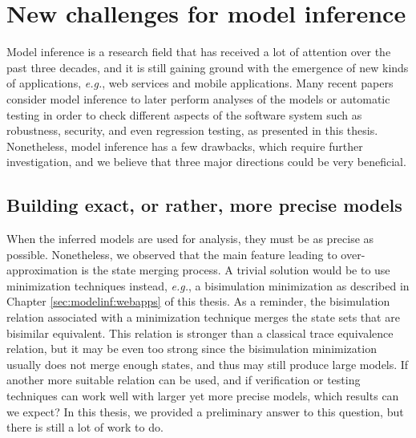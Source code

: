 \section{New challenges for model inference}
\label{sec:conclusion:modelinf}

Model inference is a research field that has received a lot of
attention over the past three decades, and it is still gaining
ground with the emergence of new kinds of applications, \emph{e.g.}, web
services and mobile applications. Many recent papers consider
model inference to later perform analyses of the models or
automatic testing in order to check different aspects of the
software system such as robustness, security, and even regression
testing, as presented in this thesis. Nonetheless, model
inference has a few drawbacks, which require further
investigation, and we believe that three major directions could
be very beneficial.

\subsection{Building exact, or rather, more precise models}
\label{sec:conclusion:modelinf:exact}

When the inferred models are used for analysis, they must be as
precise as possible. Nonetheless, we observed that the main
feature leading to over-approximation is the state merging
process. A trivial solution would be to use minimization
techniques instead, \emph{e.g.}, a bisimulation minimization as
described in Chapter \ref{sec:modelinf:webapps} of this thesis.
As a reminder, the bisimulation relation associated with a
minimization technique merges the state sets that are bisimilar
equivalent. This relation is stronger than a classical trace
equivalence relation, but it may be even too strong since the
bisimulation minimization usually does not merge enough states,
and thus may still produce large models. If another more suitable
relation can be used, and if verification or testing techniques
can work well with larger yet more precise models, which results
can we expect? In this thesis, we provided a preliminary answer
to this question, but there is still a lot of work to do.

